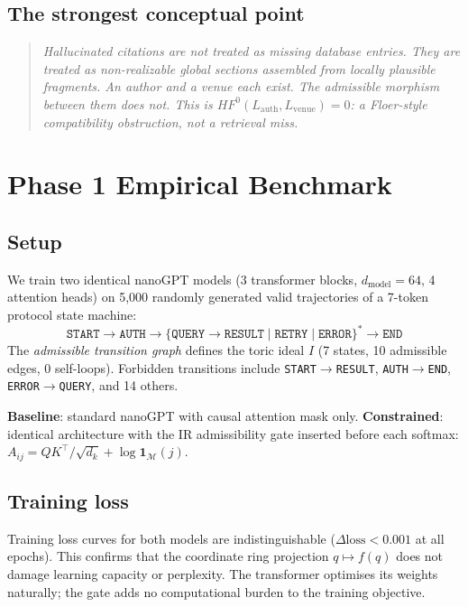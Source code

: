 \documentclass[11pt,a4paper]{article}
\begin{document}
\subsection{The strongest conceptual point}

\begin{quote}
\emph{Hallucinated citations are not treated as missing database
entries.
They are treated as non-realizable global sections assembled from
locally plausible fragments.
An author and a venue each exist.
The admissible morphism between them does not.
This is $HF^0(L_\text{auth}, L_\text{venue}) = 0$: a Floer-style
compatibility obstruction, not a retrieval miss.}
\end{quote}

\section{Phase 1 Empirical Benchmark}
\label{sec:benchmark}

\subsection{Setup}

We train two identical nanoGPT models (3 transformer blocks,
$d_\mathrm{model}=64$, 4 attention heads) on 5,000 randomly
generated valid trajectories of a 7-token protocol state machine:
\[
  \texttt{START} \to \texttt{AUTH} \to
  \{\texttt{QUERY} \to \texttt{RESULT} \mid \texttt{RETRY} \mid
    \texttt{ERROR}\}^* \to \texttt{END}
\]
The \emph{admissible transition graph} defines the toric ideal $I$
(7 states, 10 admissible edges, 0 self-loops).
Forbidden transitions include \texttt{START}$\to$\texttt{RESULT},
\texttt{AUTH}$\to$\texttt{END}, \texttt{ERROR}$\to$\texttt{QUERY},
and 14 others.

\textbf{Baseline}: standard nanoGPT with causal attention mask only.
\textbf{Constrained}: identical architecture with the IR admissibility
gate inserted before each softmax:
$A_{ij} = QK^\top/\sqrt{d_k} + \log\mathbf{1}_\mathcal{M}(j)$.

\subsection{Training loss}

Training loss curves for both models are indistinguishable
($\Delta\mathrm{loss} < 0.001$ at all epochs).
This confirms that the coordinate ring projection
$q \mapsto f(q)$ does not damage learning capacity or
perplexity. The transformer optimises its weights naturally;
the gate adds no computational burden to the training objective.
\end{document}
